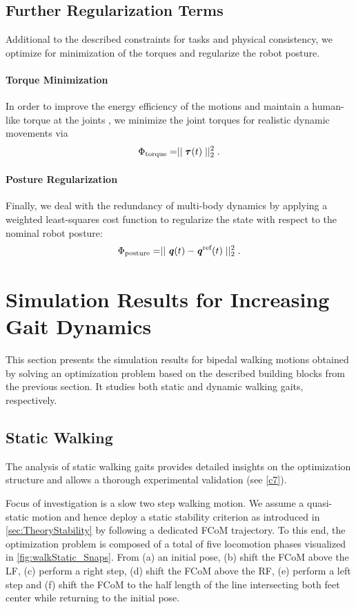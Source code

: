 \subsection{Further Regularization Terms}
Additional to the described constraints for tasks and physical consistency, we optimize for minimization of the torques and regularize the robot posture.
\paragraph{Torque Minimization}
In order to improve the energy efficiency of the motions and maintain a human-like torque at the joints \cite{kim1994modeling}, we minimize the joint torques for realistic dynamic movements via
\begin{equation*} 
\Phi_{\text{torque}}=\mid\mid \bm{\mathit{\tau}}(t)\mid\mid^2_2.
\end{equation*}
\paragraph{Posture Regularization}
Finally, we deal with the redundancy of multi-body dynamics by applying a weighted least-squares cost function to regularize the state with respect to the nominal robot posture:
\begin{equation*} 
\Phi_{\text{posture}}=\mid\mid \bm{\mathit{q}}(t)-\bm{\mathit{q}}^\text{ref}(t)\mid\mid^2_2.
\end{equation*}


\section{Simulation Results for Increasing Gait Dynamics}\label{sec:BipedSimulation}
This section presents the simulation results for bipedal walking motions obtained by solving an optimization problem based on the described building blocks from the previous section. It studies both static and dynamic walking gaits, respectively.

\subsection{Static Walking}\label{subsec:StaticWalking}
The analysis of static walking gaits provides detailed insights on the optimization structure and allows a thorough experimental validation (see \cref{c7}).

Focus of investigation is a slow two step walking motion. We assume a quasi-static motion and hence deploy a static stability criterion as introduced in \cref{sec:TheoryStability} by following a dedicated \gls{FCoM} trajectory. To this end, the optimization problem is composed of a total of five locomotion phases visualized in \cref{fig:walkStatic_Snaps}. From (a) an initial pose, (b) shift the \gls{FCoM} above the \gls{LF}, (c) perform a right step, (d) shift the \gls{FCoM} above the \gls{RF}, (e) perform a left step and (f) shift the \gls{FCoM} to the half length of the line intersecting both feet center while returning to the initial pose.

